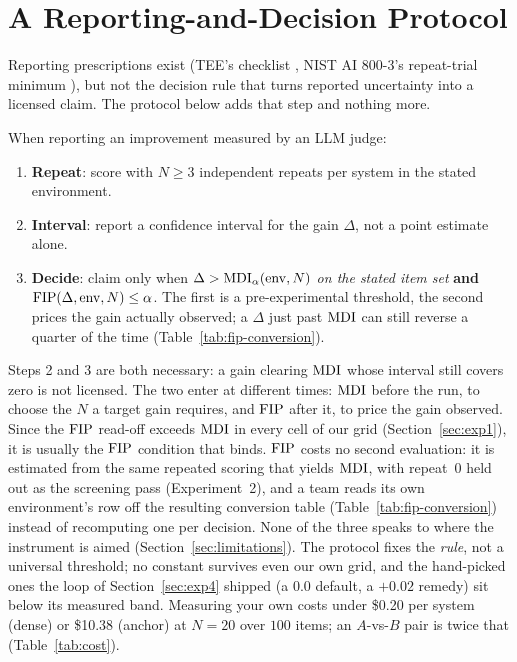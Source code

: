 \section{A Reporting-and-Decision Protocol}
\label{sec:protocol}

Reporting prescriptions exist (TEE's checklist \citep{messing2026tee}, NIST AI
800-3's repeat-trial minimum \citep{nist2026ai8003}), but not the decision
rule that turns reported uncertainty into a licensed claim. The protocol below
adds that step and nothing more.

When reporting an improvement measured by an LLM judge:
\begin{enumerate}
  \item \textbf{Repeat}: score with $N \geq 3$ independent repeats per
    system in the stated environment.
  \item \textbf{Interval}: report a confidence interval for the gain
    $\Delta$, not a point estimate alone.
  \item \textbf{Decide}: claim only when $\Delta > \mathrm{MDI}_{\alpha}(\mathrm{env}, N)$
    \emph{on the stated item set} \textbf{and} $\mathrm{FIP}(\Delta, \mathrm{env}, N) \leq
    \alpha$. The first is a pre-experimental threshold, the second prices the
    gain actually observed; a $\Delta$ just past $\mathrm{MDI}$ can still reverse a
    quarter of the time (Table~\ref{tab:fip-conversion}).
\end{enumerate}
Steps 2 and 3 are both necessary: a gain clearing $\mathrm{MDI}$ whose interval still
covers zero is not licensed.
The two enter at different times: $\mathrm{MDI}$ before the run, to choose the $N$
a target gain requires, and $\mathrm{FIP}$ after it, to price the gain observed.
Since the $\mathrm{FIP}$ read-off exceeds $\mathrm{MDI}$ in every cell of our grid
(Section~\ref{sec:exp1}), it is usually the $\mathrm{FIP}$ condition that binds.
$\mathrm{FIP}$ costs no second evaluation: it is estimated from the same repeated
scoring that yields $\mathrm{MDI}$, with repeat~$0$ held out as the screening pass
(Experiment~2), and a team reads its own environment's row off the resulting
conversion table (Table~\ref{tab:fip-conversion}) instead of recomputing one
per decision. None of the three speaks to where the
instrument is aimed (Section~\ref{sec:limitations}). The protocol fixes the \emph{rule}, not a
universal threshold; no constant survives even our own grid, and the
hand-picked ones the loop of Section~\ref{sec:exp4} shipped (a $0.0$ default,
a $+0.02$ remedy) sit below its measured band. %
Measuring your own costs under
\$0.20 per system (dense) or \$10.38 (anchor) at $N{=}20$ over $100$ items;
an $A$-vs-$B$ pair is twice that (Table~\ref{tab:cost}).


